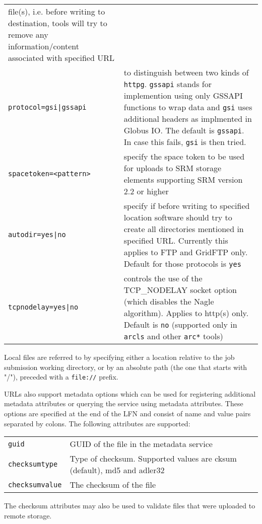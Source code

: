 \begin{longtable}{lp{10cm}}
   file(s), i.e. before writing to destination, tools will try to remove
   any information/content associated with specified URL\\
   \verb#protocol=gsi|gssapi# & to distinguish between two kinds of
   \verb#httpg#. \verb#gssapi# stands for implemention using only GSSAPI
   functions to wrap data and \verb#gsi# uses additional headers as
   implmented in Globus IO. The default is \verb#gssapi#. In case
   this fails, \verb#gsi# is then tried.\\
   \verb#spacetoken=<pattern># & specify the space token to be used for
   uploads to SRM storage elements supporting SRM version 2.2 or higher\\
   \verb#autodir=yes|no# & specify if before writing to specified location
   software should try to create all directories mentioned in specified
   URL. Currently this applies to FTP and GridFTP only. Default for those
   protocols is \verb#yes#\\
   \verb#tcpnodelay=yes|no# & controls the use of the TCP\_NODELAY
   socket option (which disables the Nagle algorithm). Applies to
   http(s) only. Default is \verb#no# (supported only in \verb#arcls# and
   other \verb#arc*# tools)\\
\end{longtable}

Local files are referred to by specifying either a location relative
to the job submission working directory, or by an absolute path (the
one that starts with "/"), preceded with a \verb#file://# prefix.

URLs also support metadata options which can be used for registering
additional metadata attributes or querying the service using metadata
attributes. These options are specified at the end of the LFN and
consist of name and value pairs separated by colons. The following
attributes are supported:

\begin{tabular}{lp{10cm}}
   \verb#guid# & GUID of the file in the metadata service \\
   \verb#checksumtype# & Type of checksum. Supported values are cksum
   (default), md5 and adler32 \\
   \verb#checksumvalue# & The checksum of the file \\
\end{tabular}

The checksum attributes may also be used to validate files that were
uploaded to remote storage.

